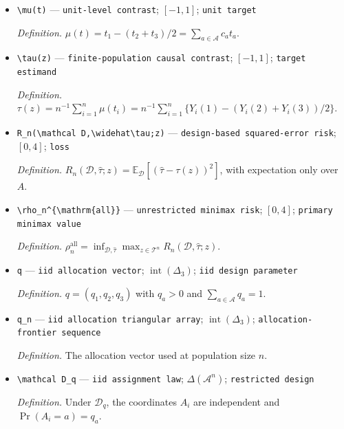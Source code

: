 \documentclass{article}
\begin{document}
\begin{itemize}
  \item \texttt{\textbackslash{}\allowbreak{}mu(t)} --- \texttt{unit-\allowbreak{}level contrast}; \([-1,1]\); \texttt{unit target}
  \par\smallskip\noindent\emph{Definition.} \(\mu(t)=t_1-(t_2+t_3)/2=\sum_{a\in\mathcal A}c_at_a\).
  \item \texttt{\textbackslash{}\allowbreak{}tau(z)} --- \texttt{finite-\allowbreak{}population causal contrast}; \([-1,1]\); \texttt{target estimand}
  \par\smallskip\noindent\emph{Definition.} \(\tau(z)=n^{-1}\sum_{i=1}^n\mu(t_i)=n^{-1}\sum_{i=1}^n\{Y_i(1)-(Y_i(2)+Y_i(3))/2\}\).
  \item \texttt{R\_\allowbreak{}n(\textbackslash{}\allowbreak{}mathcal D,\allowbreak{}\textbackslash{}\allowbreak{}widehat\textbackslash{}\allowbreak{}tau;\allowbreak{}z)} --- \texttt{design-\allowbreak{}based squared-\allowbreak{}error risk}; \([0,4]\); \texttt{loss}
  \par\smallskip\noindent\emph{Definition.} \(R_n(\mathcal D,\widehat\tau;z)=\mathbb E_{\mathcal D}[(\widehat\tau-\tau(z))^2]\), with expectation only over \(A\).
  \item \texttt{\textbackslash{}\allowbreak{}rho\_\allowbreak{}n\textasciicircum{}\{\textbackslash{}\allowbreak{}mathrm\{all\}\allowbreak{}\}\allowbreak{}} --- \texttt{unrestricted minimax risk}; \([0,4]\); \texttt{primary minimax value}
  \par\smallskip\noindent\emph{Definition.} \(\rho_n^{\mathrm{all}}=\inf_{\mathcal D,\widehat\tau}\max_{z\in\mathcal T^n}R_n(\mathcal D,\widehat\tau;z)\).
  \item \texttt{q} --- \texttt{iid allocation vector}; \(\operatorname{int}(\Delta_3)\); \texttt{iid design parameter}
  \par\smallskip\noindent\emph{Definition.} \(q=(q_1,q_2,q_3)\) with \(q_a>0\) and \(\sum_{a\in\mathcal A}q_a=1\).
  \item \texttt{q\_\allowbreak{}n} --- \texttt{iid allocation triangular array}; \(\operatorname{int}(\Delta_3)\); \texttt{allocation-\allowbreak{}frontier sequence}
  \par\smallskip\noindent\emph{Definition.} The allocation vector used at population size \(n\).
  \item \texttt{\textbackslash{}\allowbreak{}mathcal D\_\allowbreak{}q} --- \texttt{iid assignment law}; \(\Delta(\mathcal A^n)\); \texttt{restricted design}
  \par\smallskip\noindent\emph{Definition.} Under \(\mathcal D_q\), the coordinates \(A_i\) are independent and \(\Pr(A_i=a)=q_a\).

\end{itemize}
\end{document}
